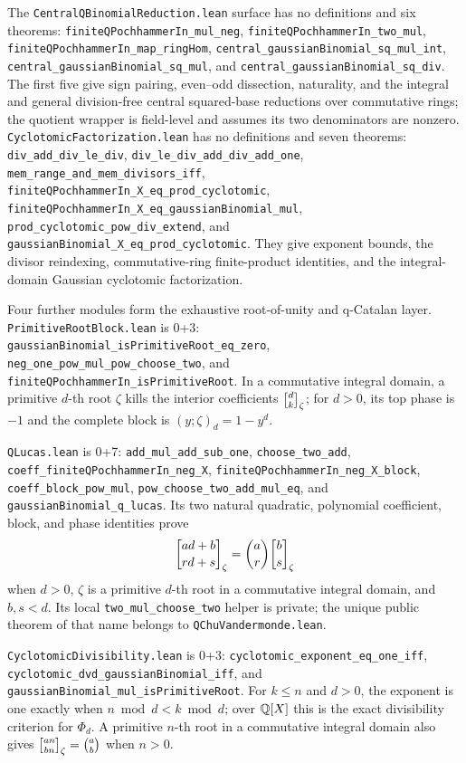 \documentclass[11pt,oneside]{article}
\theoremstyle{definition}
\theoremstyle{remark}
\begin{document}
The \nolinkurl{CentralQBinomialReduction.lean} surface has no
definitions and six theorems:
\nolinkurl{finiteQPochhammerIn_mul_neg},
\nolinkurl{finiteQPochhammerIn_two_mul},
\nolinkurl{finiteQPochhammerIn_map_ringHom},
\nolinkurl{central_gaussianBinomial_sq_mul_int},
\nolinkurl{central_gaussianBinomial_sq_mul}, and
\nolinkurl{central_gaussianBinomial_sq_div}.  The first five give sign pairing,
even--odd dissection, naturality, and the integral and general division-free
central squared-base reductions over commutative rings; the quotient wrapper
is field-level and assumes its two denominators are nonzero.
\nolinkurl{CyclotomicFactorization.lean} has no definitions and seven theorems:
\nolinkurl{div_add_div_le_div}, \nolinkurl{div_le_div_add_div_add_one},
\nolinkurl{mem_range_and_mem_divisors_iff},
\nolinkurl{finiteQPochhammerIn_X_eq_prod_cyclotomic},
\nolinkurl{finiteQPochhammerIn_X_eq_gaussianBinomial_mul},
\nolinkurl{prod_cyclotomic_pow_div_extend}, and
\nolinkurl{gaussianBinomial_X_eq_prod_cyclotomic}.  They give exponent bounds,
the divisor reindexing, commutative-ring finite-product identities, and the
integral-domain Gaussian cyclotomic factorization.

Four further modules form the exhaustive root-of-unity and q-Catalan layer.
\nolinkurl{PrimitiveRootBlock.lean} is 0+3:
\nolinkurl{gaussianBinomial_isPrimitiveRoot_eq_zero},
\nolinkurl{neg_one_pow_mul_pow_choose_two}, and
\nolinkurl{finiteQPochhammerIn_isPrimitiveRoot}.  In a commutative integral
domain, a primitive \(d\)-th root \(\zeta\) kills the interior coefficients
\(\GaussianBinomial{d}{k}{\zeta}\); for \(d>0\), its top phase is \(-1\) and
the complete block is \((y;\zeta)_d=1-y^d\).

\nolinkurl{QLucas.lean} is 0+7:
\nolinkurl{add_mul_add_sub_one},
\nolinkurl{choose_two_add}, \nolinkurl{coeff_finiteQPochhammerIn_neg_X},
\nolinkurl{finiteQPochhammerIn_neg_X_block},
\nolinkurl{coeff_block_pow_mul}, \nolinkurl{pow_choose_two_add_mul_eq}, and
\nolinkurl{gaussianBinomial_q_lucas}.  Its two natural quadratic, polynomial
coefficient, block, and phase identities prove
\[
 \GaussianBinomial{ad+b}{rd+s}{\zeta}
 =\binom ar\GaussianBinomial{b}{s}{\zeta}
\]
when \(d>0\), \(\zeta\) is a primitive \(d\)-th root in a commutative integral
domain, and \(b,s<d\).
Its local \nolinkurl{two_mul_choose_two} helper is private; the unique public
theorem of that name belongs to \nolinkurl{QChuVandermonde.lean}.

\nolinkurl{CyclotomicDivisibility.lean} is 0+3:
\nolinkurl{cyclotomic_exponent_eq_one_iff},
\nolinkurl{cyclotomic_dvd_gaussianBinomial_iff}, and
\nolinkurl{gaussianBinomial_mul_isPrimitiveRoot}.  For \(k\le n\) and \(d>0\),
the exponent is one exactly when \(n\bmod d<k\bmod d\); over
\(\mathbb{Q}[X]\) this is the exact divisibility criterion for
\(\Phi_d\).  A primitive \(n\)-th root in a commutative integral domain also
gives \(\GaussianBinomial{an}{bn}{\zeta}=\binom ab\) when \(n>0\).
\end{document}
